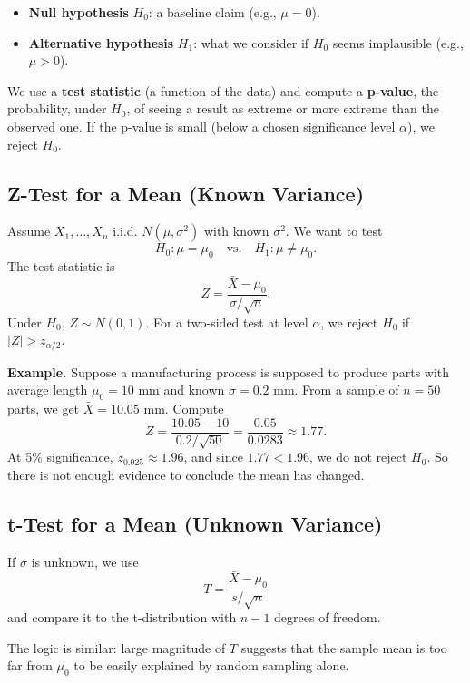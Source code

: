 \documentclass[11pt,a4paper]{article}
\begin{document}
\begin{itemize}
    \item \textbf{Null hypothesis} \(H_0\): a baseline claim (e.g., \(\mu = 0\)).
    \item \textbf{Alternative hypothesis} \(H_1\): what we consider if \(H_0\) seems implausible (e.g., \(\mu > 0\)).
\end{itemize}

We use a \textbf{test statistic} (a function of the data) and compute a \textbf{p-value}, the probability, under \(H_0\), of seeing a result as extreme or more extreme than the observed one.  
If the p-value is small (below a chosen significance level \(\alpha\)), we reject \(H_0\).

\subsection{Z-Test for a Mean (Known Variance)}

Assume \(X_1,\dots,X_n\) i.i.d. \(N(\mu,\sigma^2)\) with known \(\sigma^2\).  
We want to test
\[
H_0: \mu = \mu_0 \quad \text{vs.} \quad H_1: \mu \ne \mu_0.
\]
The test statistic is
\[
Z = \frac{\bar{X} - \mu_0}{\sigma/\sqrt{n}}.
\]
Under \(H_0\), \(Z \sim N(0,1)\).  
For a two-sided test at level \(\alpha\), we reject \(H_0\) if \(|Z| > z_{\alpha/2}\).

\textbf{Example.}  
Suppose a manufacturing process is supposed to produce parts with average length \(\mu_0 = 10\) mm and known \(\sigma=0.2\) mm.  
From a sample of \(n=50\) parts, we get \(\bar{X}=10.05\) mm.  
Compute
\[
Z = \frac{10.05 - 10}{0.2/\sqrt{50}}
= \frac{0.05}{0.0283} \approx 1.77.
\]
At 5\% significance, \(z_{0.025}\approx1.96\), and since \(1.77 < 1.96\), we do not reject \(H_0\).  
So there is not enough evidence to conclude the mean has changed.

\subsection{t-Test for a Mean (Unknown Variance)}

If \(\sigma\) is unknown, we use
\[
T = \frac{\bar{X} - \mu_0}{s/\sqrt{n}}
\]
and compare it to the t-distribution with \(n-1\) degrees of freedom.

The logic is similar: large magnitude of \(T\) suggests that the sample mean is too far from \(\mu_0\) to be easily explained by random sampling alone.

\newpage

\end{document}
